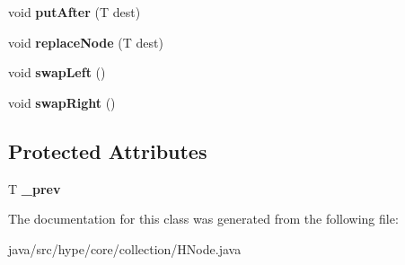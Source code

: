 \begin{DoxyCompactItemize}
\item 
\hypertarget{classhype_1_1core_1_1collection_1_1_h_node_3_01_t_01extends_01_h_node_3_01_t_01_4_01_4_aa3fbeef7de01dccdc893b8c15fb85e79}{void {\bfseries put\-After} (T dest)}\label{classhype_1_1core_1_1collection_1_1_h_node_3_01_t_01extends_01_h_node_3_01_t_01_4_01_4_aa3fbeef7de01dccdc893b8c15fb85e79}

\item 
\hypertarget{classhype_1_1core_1_1collection_1_1_h_node_3_01_t_01extends_01_h_node_3_01_t_01_4_01_4_a93127a609ba26bce9e7cfaeb1a37008d}{void {\bfseries replace\-Node} (T dest)}\label{classhype_1_1core_1_1collection_1_1_h_node_3_01_t_01extends_01_h_node_3_01_t_01_4_01_4_a93127a609ba26bce9e7cfaeb1a37008d}

\item 
\hypertarget{classhype_1_1core_1_1collection_1_1_h_node_3_01_t_01extends_01_h_node_3_01_t_01_4_01_4_ae0fb1ff2089707b9d8af750e6ddf3c42}{void {\bfseries swap\-Left} ()}\label{classhype_1_1core_1_1collection_1_1_h_node_3_01_t_01extends_01_h_node_3_01_t_01_4_01_4_ae0fb1ff2089707b9d8af750e6ddf3c42}

\item 
\hypertarget{classhype_1_1core_1_1collection_1_1_h_node_3_01_t_01extends_01_h_node_3_01_t_01_4_01_4_a0217d8af39174f7acae8e1587d5ddd9f}{void {\bfseries swap\-Right} ()}\label{classhype_1_1core_1_1collection_1_1_h_node_3_01_t_01extends_01_h_node_3_01_t_01_4_01_4_a0217d8af39174f7acae8e1587d5ddd9f}

\end{DoxyCompactItemize}
\subsection*{Protected Attributes}
\begin{DoxyCompactItemize}
\item 
\hypertarget{classhype_1_1core_1_1collection_1_1_h_node_3_01_t_01extends_01_h_node_3_01_t_01_4_01_4_a84f1eca2f26581309ae325b13fd13252}{T {\bfseries \-\_\-prev}}\label{classhype_1_1core_1_1collection_1_1_h_node_3_01_t_01extends_01_h_node_3_01_t_01_4_01_4_a84f1eca2f26581309ae325b13fd13252}

\end{DoxyCompactItemize}


The documentation for this class was generated from the following file\-:\begin{DoxyCompactItemize}
\item 
java/src/hype/core/collection/H\-Node.\-java\end{DoxyCompactItemize}
